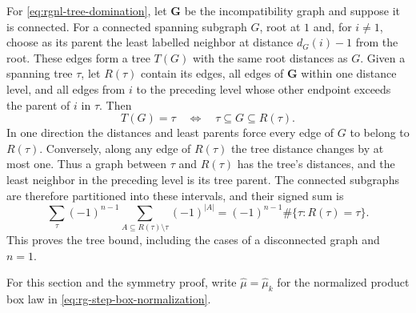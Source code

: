 For \eqref{eq:rgnl-tree-domination}, let $\mathbf G$ be
the incompatibility graph and suppose it is connected.
For a connected spanning subgraph $G$, root at $1$ and,
for $i\ne1$, choose as its parent the least labelled
neighbor at distance $d_G(i)-1$ from the root.
These edges form a tree $T(G)$ with the same root distances
as $G$. Given a spanning tree $\tau$, let $R(\tau)$ contain
its edges, all edges of $\mathbf G$ within one distance
level, and all edges from $i$ to the preceding level whose
other endpoint exceeds the parent of $i$ in $\tau$.
Then
\[
 T(G)=\tau\quad\Longleftrightarrow\quad
                                      \tau\subseteq G\subseteq R(\tau).
\]
In one direction the distances and least parents force
every edge of $G$ to belong to $R(\tau)$.
Conversely, along any edge of $R(\tau)$ the tree distance
changes by at most one. Thus a graph between $\tau$ and
$R(\tau)$ has the tree's distances, and the least neighbor
in the preceding level is its tree parent.
The connected subgraphs are therefore partitioned into
these intervals, and their signed sum is
\[
 \sum_\tau(-1)^{n-1}
           \sum_{A\subseteq R(\tau)\setminus\tau}(-1)^{|A|}
 =(-1)^{n-1}\#\{\tau:R(\tau)=\tau\}.
\]
This proves the tree bound, including the cases
of a disconnected graph and $n=1$.

For this section and the symmetry proof, write $\widehat\mu=\widehat\mu_k$ for the normalized product box law in \eqref{eq:rg-step-box-normalization}.

